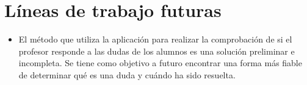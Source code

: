 
\section{Líneas de trabajo futuras}
\begin{itemize}
	\item
	El método que utiliza la aplicación para realizar la comprobación de si el profesor responde a las dudas de los alumnos es una solución preliminar e incompleta. Se tiene como objetivo a futuro encontrar una forma más fiable de determinar qué es una duda y cuándo ha sido resuelta.
\end{itemize}